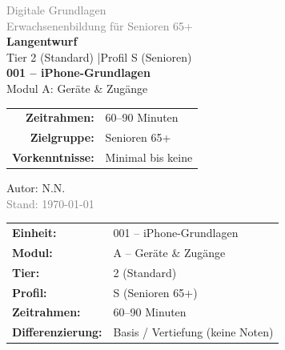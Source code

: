 \documentclass[11pt,a4paper]{article}
\newcommand{\einheitnummer}{001}                    %
\newcommand{\einheitthema}{iPhone-Grundlagen}       %
\newcommand{\modulname}{Geräte \& Zugänge}          %
\newcommand{\modulbuchstabe}{A}
\newcommand{\zeitrahmen}{60--90 Minuten}            %
\newcommand{\autor}{N.N.}
\begin{document}
\begin{titlepage}
    \centering
    \vspace*{2cm}

    {\Large\textcolor{gray}{Digitale Grundlagen}}\\[0.5cm]
    {\large\textcolor{gray}{Erwachsenenbildung für Senioren 65+}}\\[2cm]

    {\Huge\textcolor{fach}{\textbf{Langentwurf}}}\\[0.5cm]
    {\large Tier 2 (Standard) \quad|\quad Profil S (Senioren)}\\[2cm]

    {\LARGE\textbf{\einheitnummer{} -- \einheitthema}}\\[0.5cm]
    {\large Modul \modulbuchstabe: \modulname}\\[2cm]

    \begin{tabular}{rl}
        \textbf{Zeitrahmen:} & \zeitrahmen \\[0.3cm]
        \textbf{Zielgruppe:} & Senioren 65+ \\[0.3cm]
        \textbf{Vorkenntnisse:} & Minimal bis keine \\[0.3cm]
    \end{tabular}

    \vfill

    {\large Autor: \autor}\\[0.3cm]
    {\normalsize\textcolor{gray}{Stand: \today}}\\[1cm]

\end{titlepage}

\tableofcontents
\newpage

\begin{infobox}[Konfiguration]
\begin{tabular}{ll}
    \textbf{Einheit:} & \einheitnummer{} -- \einheitthema \\[0.3em]
    \textbf{Modul:} & \modulbuchstabe{} -- \modulname \\[0.3em]
    \textbf{Tier:} & 2 (Standard) \\[0.3em]
    \textbf{Profil:} & S (Senioren 65+) \\[0.3em]
    \textbf{Zeitrahmen:} & \zeitrahmen \\[0.3em]
    \textbf{Differenzierung:} & Basis / Vertiefung (keine Noten)
\end{tabular}
\end{infobox}
\end{document}
